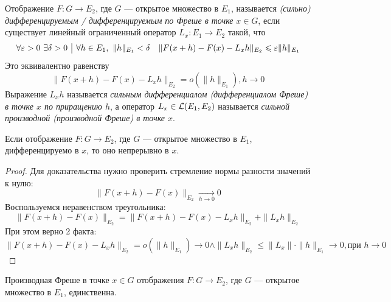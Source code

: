 \begin{definition} 
    Отображение $F \colon G \to E_2$, где $G$ --- открытое множество в $E_1$, называется \textit{(сильно) дифференцируемым / дифференцируемым по Фреше  в точке} $x \in G$, если существует линейный ограниченный оператор $L_x \colon E_1 \to E_2$ такой, что 
    \[
        \forall \varepsilon > 0\ \exists \delta > 0 \ \big|\  \forall h \in E_1,\ \|h\|_{E_1} < \delta \quad \|F(x + h) - F(x) - L_xh\|_{E_2} \leqslant \varepsilon \|h\|_{E_1}
    \]
    Это эквивалентно равенству
    \[
        \|F(x+h)-F(x)-L_x h\|_{E_2}=o(\|h\|_{E_1}), h \to 0
    \]
    Выражение $L_xh$ называется \textit{сильным дифференциалом (дифференциалом Фреше) в точке $x$ по приращению $h$}, а оператор $L_x\in\mathcal{L}(E_1, E_2)$ называется \textit{сильной производной (производной Фреше) в точке $x$}.
\end{definition}

\begin{proposition}
    Если отображение $F \colon G \to E_2$, где $G$ --- открытое множество в $E_1$, дифференцируемо в $x$, то оно непрерывно в $x$.
\end{proposition}
\begin{proof}
 	Для доказательства нужно проверить стремление нормы разности значений к нулю:
    \[
        \|F(x + h) - F(x)\|_{E_2} \xrightarrow[h \to 0]{} 0
    \]
    Воспользуемся неравенством треугольника:
    \[  
        \|F(x + h) - F(x)\|_{E_2} = \|F(x + h) - F(x) - L_xh\|_{E_2} + \|L_xh\|_{E_2}
    \]
    При этом верно 2 факта:
    \[
        \|F(x + h) - F(x) - L_xh\|_{E_2} = o(\|h\|_{E_1}) \to 0 \wedge \|L_xh\|_{E_2} \leq \|L_x\| \cdot \|h\|_{E_1} \to 0, \text{при } h\to 0
    \]
\end{proof}

\begin{proposition}
    Производная Фреше в точке $x \in G$ отображения $F \colon G \to E_2$, где $G$ --- открытое множество в $E_1$, единственна.
\end{proposition}

